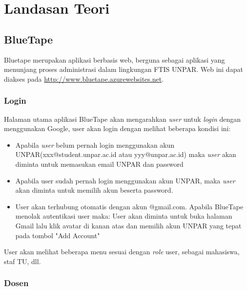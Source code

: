 \chapter{Landasan Teori}
\label{chap:teori}

\section{BlueTape}
\label{sec:bluetape}
Bluetape merupakan aplikasi berbasis web, berguna sebagai aplikasi yang menunjang proses administrasi dalam lingkungan FTIS UNPAR. Web ini dapat diakses pada \url{http://www.bluetape.azurewebsites.net}. \cite{blueTape}

\subsection{Login}
Halaman utama aplikasi BlueTape akan mengarahkan \textit{user} untuk \textit{login} dengan menggunakan Google, user akan login dengan melihat beberapa kondisi ini:
\begin{itemize}
\item Apabila \textit{user} belum pernah login menggunakan akun UNPAR(xxx@student.unpar.ac.id atau yyy@unpar.ac.id) maka  \textit{user} akan diminta untuk memasukan email UNPAR dan password
\item Apabila user sudah pernah login menggunakan akun UNPAR, maka \textit{user} akan diminta untuk memilih akun beserta password.
\item User akan terhubung otomatis dengan akun @gmail.com. Apabila BlueTape menolak autentikasi user maka: User akan diminta untuk buka halaman Gmail lalu klik avatar di kanan atas dan memilih akun UNPAR yang tepat pada tombol "Add Account"
\end{itemize}
User akan melihat beberapa menu sesuai dengan \textit{role} user, sebagai mahasiswa, staf TU, dll.

\subsection{Dosen}
